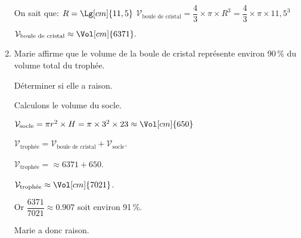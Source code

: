 \begin{corrige}
\begin{enumerate}
        {\color{red}On sait que: $R = \Lg[cm]{11,5}$        
            $\mathcal{V}_{\text{boule de cristal}} = \dfrac{4}{3} \times  \pi \times  R^3 =  \dfrac{4}{3} \times  \pi \times   11,5^3 $
            
            $\mathcal{V}_{\text{boule de cristal}} \approx \Vol[cm]{6371}.$
        }
        \item Marie affirme que le volume de la boule de cristal représente environ 90\,\% du volume total du trophée.

        Déterminer si elle a raison.

        {\color{red}Calculons le volume du socle.
            
            $\mathcal{V}_{\text{socle}} = \pi r^2 \times H = \pi \times 3^2 \times 23 \approx \Vol[cm]{650}$
            
            $\mathcal{V}_{\text{trophée}}= \mathcal{V}_{\text{boule de cristal}} + \mathcal{V}_{\text{socle}}$.

            $\mathcal{V}_{\text{trophée}}=\approx \num{6371} + 650$.

            $\mathcal{V}_{\text{trophée}}\approx \Vol[cm]{7021}$.
            
            Or $\dfrac{\num{6371}}{\num{7021}}\approx  \num{0,907}$ soit environ 91\,\%.
            
            Marie a donc raison.
        }
    \end{enumerate}
\end{corrige}
